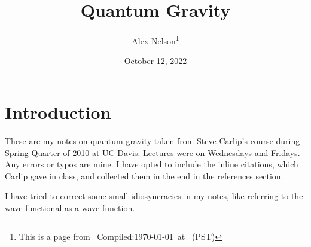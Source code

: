 \documentclass{article}
\title{Quantum Gravity}
\author{Alex Nelson\thanks{This is a page from \homeurl{}\hfil\break\indent\;\, Compiled:\enspace\today\ at \currenttime\ (PST)}}
\date{October 12, 2022}
\begin{document}
\maketitle

\section*{Introduction}
These are my notes on quantum gravity taken from Steve Carlip's course during Spring Quarter of 2010 at UC Davis. Lectures were on Wednesdays and Fridays.
Any errors or typos are mine. I have opted to include the inline citations, which Carlip gave in class, and collected them in the end in the references section.

I have tried to correct some small idiosyncracies in my notes, like
referring to the wave functional as a wave function.














\end{document}
